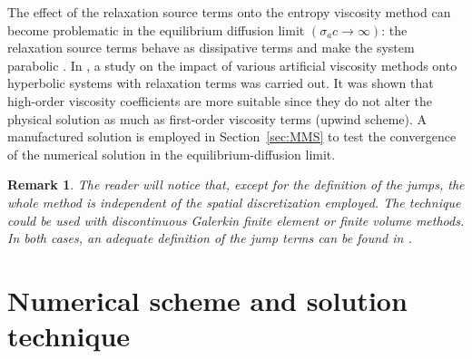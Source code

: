 \documentclass[review]{elsarticle}
\newtheorem{remark}{Remark}[section]
\newcommand{\sect}[1]{Section~\ref{#1}}                     %
\begin{document}
The effect of the relaxation source terms onto the entropy viscosity method can become problematic in the equilibrium diffusion limit $(\sigma_a c \to \infty)$: the relaxation source terms behave as dissipative terms and make the system parabolic \cite{Leveque}. In \cite{ShiJin}, a study on the impact of various artificial viscosity methods onto hyperbolic systems with relaxation terms was carried out. It was shown that high-order viscosity coefficients are more suitable since they do not alter the physical solution as much as first-order viscosity terms (upwind scheme). A manufactured  solution is employed in \sect{sec:MMS} to test the convergence of the numerical solution in the equilibrium-diffusion limit.  

 \begin{remark}
The reader will notice that, except for the definition of the jumps, the whole method is independent of the spatial discretization employed. The technique could be used with discontinuous Galerkin finite element or finite volume methods. In both cases, an adequate  definition of the jump terms can be found in \cite{valentin}.
 \end{remark}
%
\section{Numerical scheme and solution technique}
\label{sec:num-scheme}
\end{document}
